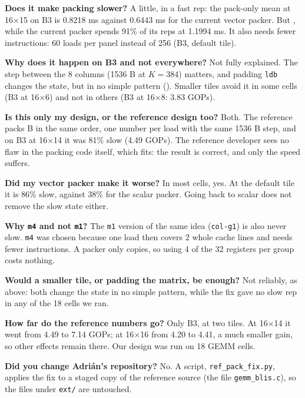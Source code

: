 \textbf{Does it make packing slower?} A little, in a fast rep: the pack-only mean at 16$\times$15 on B3 is 0.8218 ms against 0.6443 ms for the
current vector packer. But , while the current packer spends 91\% of its reps at 1.1994 ms. It also needs fewer
instructions: 60 loads per panel instead of 256 (B3, default tile).

\textbf{Why does it happen on B3 and not everywhere?} Not fully explained. The step between the 8 columns (1536 B at $K=384$) matters, and padding
\texttt{ldb} changes the state, but in no simple pattern (). Smaller tiles avoid it in some cells (B3 at 16$\times$6) and not in others
(B3 at 16$\times$8: 3.83 GOPs).

\textbf{Is this only my design, or the reference design too?} Both. The reference packs B in the same order, one number per load with the same
1536 B step, and on B3 at 16$\times$14 it was 81\% slow (4.49 GOPs). The reference developer sees no flaw in the packing code itself, which fits:
the result is correct, and only the speed suffers.

\textbf{Did my vector packer make it worse?} In most cells, yes. At the default tile it is 86\% slow, against 38\% for the scalar packer.
Going back to scalar does not remove the slow state either.

\textbf{Why \texttt{m4} and not \texttt{m1}?} The \texttt{m1} version of the same idea (\texttt{col-g1}) is also never slow. \texttt{m4} was chosen
because one load then covers 2 whole cache lines and needs fewer instructions. A packer only copies, so using 4 of the 32 registers
per group costs nothing.

\textbf{Would a smaller tile, or padding the matrix, be enough?} Not reliably, as above: both change the state in no simple pattern, while the
fix gave no slow rep in any of the 18 cells we ran.

\textbf{How far do the reference numbers go?} Only B3, at two tiles. At 16$\times$14 it went from 4.49 to 7.14 GOPs; at 16$\times$16 from 4.20 to
4.41, a much smaller gain, so other effects remain there. Our design was run on 18 GEMM cells.

\textbf{Did you change Adri\'an's repository?} No. A script, \texttt{ref\_pack\_fix.py}, applies the fix to a staged copy of the reference source (the file \texttt{gemm\_blis.c}), so
the files under \texttt{ext/} are untouched.

